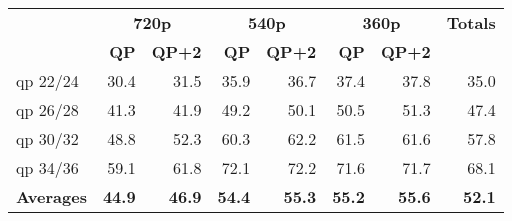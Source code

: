 \begin{table}[htbp]
{\begin{tabular}{l|rr|rr|rr|r}
       & \multicolumn{2}{c|}{\textbf{720p}} & \multicolumn{2}{c|}{\textbf{540p}} & \multicolumn{2}{c|}{\textbf{360p}} & \multicolumn{1}{c}{\textbf{Totals}} \\
       & \textbf{QP} & \textbf{QP+2} & \textbf{QP} & \textbf{QP+2} & \textbf{QP} & \textbf{QP+2} &  \\
    qp 22/24 & 30.4 & 31.5 & 35.9 & 36.7 & 37.4 & 37.8 & 35.0 \\
    qp 26/28 & 41.3 & 41.9 & 49.2 & 50.1 & 50.5 & 51.3 & 47.4 \\
    qp 30/32 & 48.8 & 52.3 & 60.3 & 62.2 & 61.5 & 61.6 & 57.8 \\
    qp 34/36 & 59.1 & 61.8 & 72.1 & 72.2 & 71.6 & 71.7 & 68.1 \\
    \textbf{Averages} & \textbf{44.9} & \textbf{46.9} & \textbf{54.4} & \textbf{55.3} & \textbf{55.2} & \textbf{55.6} & \textbf{52.1} \\
    \bottomrule
    \end{tabular}%
  }
  \label{tab:sbh0_pruning_rdoq0_pp_l2}%
\end{table}%
